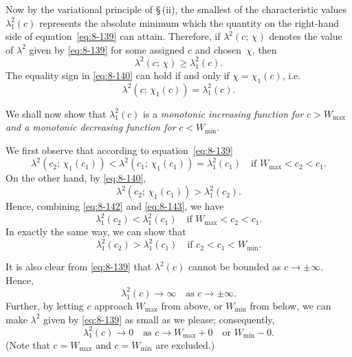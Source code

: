 Now by the variational principle of \S\,(ii), the smallest of the characteristic values $\lambda_1^2(c)$ represents the absolute minimum which the quantity on the right-hand side of equation~\eqref{eq:8-139} can attain. Therefore, if $\lambda^2(c;\,\chi)$ denotes the value of $\lambda^2$ given by \eqref{eq:8-139} for some assigned $c$ and chosen~$\chi$, then
\begin{equation}
\label{eq:8-140}
\lambda^2(c;\,\chi) \geqslant \lambda_1^2(c).
\end{equation}
The equality sign in \eqref{eq:8-140} can hold if and only if $\chi = \chi_1(c)$, i.e.\
\begin{equation}
\label{eq:8-141}
\lambda^2(c;\,\chi_1(c)) = \lambda_1^2(c).
\end{equation}

We shall now show that $\lambda_1^2(c)$ is a \emph{monotonic increasing function for} $c > W_{\max}$ \emph{and a monotonic decreasing function for} $c < W_{\min}$.

We first observe that according to equation~\eqref{eq:8-139}
\begin{equation}
\label{eq:8-142}
\lambda^2(c_2;\,\chi_1(c_1)) < \lambda^2(c_1;\,\chi_1(c_1)) = \lambda_1^2(c_1)\quad \text{if } W_{\max} < c_2 < c_1.
\end{equation}
On the other hand, by \eqref{eq:8-140},
\begin{equation}
\label{eq:8-143}
\lambda^2(c_2;\,\chi_1(c_1)) > \lambda_1^2(c_2).
\end{equation}
Hence, combining \eqref{eq:8-142} and \eqref{eq:8-143}, we have
\begin{equation}
\label{eq:8-144}
\lambda_1^2(c_2) < \lambda_1^2(c_1)\quad \text{if } W_{\max} < c_2 < c_1.
\end{equation}
In exactly the same way, we can show that
\begin{equation}
\label{eq:8-145}
\lambda_1^2(c_2) > \lambda_1^2(c_1)\quad \text{if } c_2 < c_1 < W_{\min}.
\end{equation}

It is also clear from \eqref{eq:8-139} that $\lambda^2(c)$ cannot be bounded as $c\to \pm\infty$.
Hence,
\begin{equation}
\label{eq:8-146}
\lambda_1^2(c) \to \infty \quad \text{as } c \to \pm\infty.
\end{equation}
Further, by letting $c$ approach $W_{\max}$ from above, or $W_{\min}$ from below, we can make $\lambda^2$ given by \eqref{eq:8-139} as small as we please; consequently,
\begin{equation}
\label{eq:8-147}
\lambda_1^2(c) \to 0 \quad \text{as } c \to W_{\max}+0 \quad \text{or } W_{\min}-0.
\end{equation}
(Note that $c = W_{\max}$ and $c = W_{\min}$ are excluded.)

